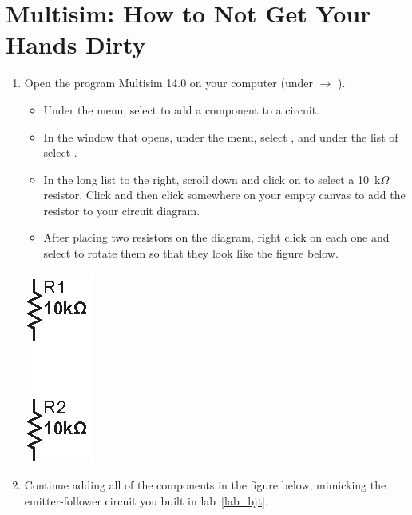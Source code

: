 \section{Multisim: How to Not Get Your Hands Dirty}
\label{lab_multisim}


\bigskip

\begin{enumerate}[wide]

\item Open the program Multisim 14.0 on your computer (under  $\longrightarrow$ ).  
\begin{itemize}
\item Under the  menu, select  to add a component to a circuit.  
\item In the window that opens, under the  menu, select , and under the list of  select .  
\item In the long list to the right, scroll down and click on  to select a 10~k$\Omega$ resistor.  Click  and then click somewhere on your empty canvas to add the resistor to your circuit diagram.   
\item After placing two resistors on the diagram, right click on each one and select  to rotate them so that they look like the figure below.  
\end{itemize}
\begin{center}
\includegraphics{multisim/two_resistors.eps}
\end{center}

\item Continue adding all of the components in the figure below, mimicking the emitter-follower circuit you built in lab~\ref{lab_bjt}. 


\end{enumerate}
